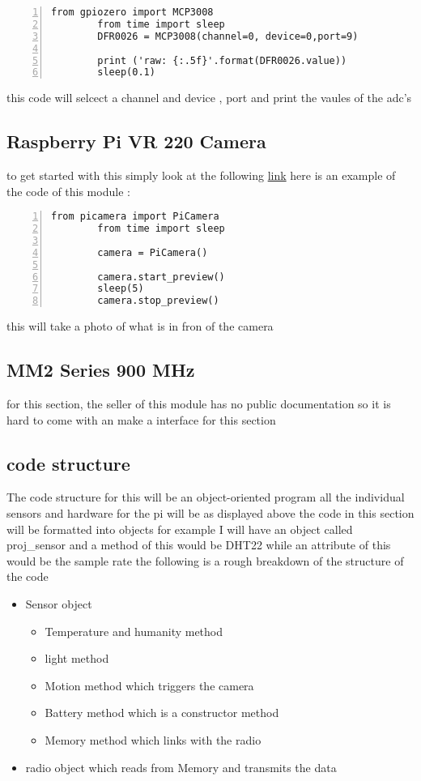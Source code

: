 	\label{adc code}
	\begin{lstlisting}[style=mystyle,caption={ADC code},numbers=left,firstnumber=1]
		from gpiozero import MCP3008
		from time import sleep
		DFR0026 = MCP3008(channel=0, device=0,port=9)
	
		print ('raw: {:.5f}'.format(DFR0026.value))
		sleep(0.1)
	\end{lstlisting}
	this code will  selcect a  channel and device , port and  print the vaules of the adc's
	\subsection{Raspberry Pi VR 220 Camera}
	to get started with this simply look at the following \href{https://projects.raspberrypi.org/en/projects/getting-started-with-picamera/4}{link}
	here is an example of the code of this module :
	\begin{lstlisting}[style=mystyle,caption={example code for camera},numbers=left,firstnumber=1]
		from picamera import PiCamera
		from time import sleep

		camera = PiCamera()

		camera.start_preview()
		sleep(5)
		camera.stop_preview()
	\end{lstlisting}
	this will  take a photo of what is in fron of the  camera

	\subsection{MM2 Series 900 MHz}
	for this section, the seller of this module has no public  documentation so it is hard to  come  with  an make a  interface for  this section   
	\subsection{code structure}
	The code structure for this  will be an object-oriented program all the individual sensors and  hardware  for the pi will be as displayed above the code in this section will be formatted into objects for example I will have an  object   called proj\_sensor and  a method of this  would be  DHT22 while an attribute of this would  be  the  sample rate
	the following is a  rough breakdown of the  structure of the code
	\begin{itemize}
		\item Sensor object
		
		\begin{itemize}
			\item Temperature and humanity method
			\item light method
			\item Motion method which triggers the camera
			\item Battery method which is a constructor method
			\item Memory method which  links with the radio 
		
		\end{itemize}
		
		\item radio object which reads from Memory and  transmits the data 
	
	\end{itemize}
